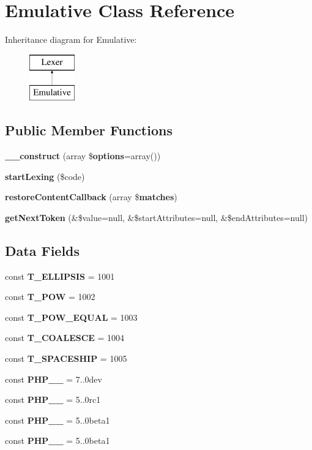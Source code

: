\section{Emulative Class Reference}
\label{class_php_parser_1_1_lexer_1_1_emulative}
Inheritance diagram for Emulative\+:\begin{figure}[H]
\begin{center}
\leavevmode
\includegraphics[height=2.000000cm]{class_php_parser_1_1_lexer_1_1_emulative}
\end{center}
\end{figure}
\subsection*{Public Member Functions}
\begin{DoxyCompactItemize}
\item 
{\bf \+\_\+\+\_\+construct} (array \${\bf options}=array())
\item 
{\bf start\+Lexing} (\$code)
\item 
{\bf restore\+Content\+Callback} (array \${\bf matches})
\item 
{\bf get\+Next\+Token} (\&\$value=null, \&\$start\+Attributes=null, \&\$end\+Attributes=null)
\end{DoxyCompactItemize}
\subsection*{Data Fields}
\begin{DoxyCompactItemize}
\item 
const {\bf T\+\_\+\+E\+L\+L\+I\+P\+S\+I\+S} = 1001
\item 
const {\bf T\+\_\+\+P\+O\+W} = 1002
\item 
const {\bf T\+\_\+\+P\+O\+W\+\_\+\+E\+Q\+U\+A\+L} = 1003
\item 
const {\bf T\+\_\+\+C\+O\+A\+L\+E\+S\+C\+E} = 1004
\item 
const {\bf T\+\_\+\+S\+P\+A\+C\+E\+S\+H\+I\+P} = 1005
\item 
const {\bf P\+H\+P\+\_\+\_} = \textquotesingle{}7..\+0dev\textquotesingle{}
\item 
const {\bf P\+H\+P\+\_\+\_} = \textquotesingle{}5..\+0rc1\textquotesingle{}
\item 
const {\bf P\+H\+P\+\_\+\_} = \textquotesingle{}5..\+0beta1\textquotesingle{}
\item 
const {\bf P\+H\+P\+\_\+\_} = \textquotesingle{}5..\+0beta1\textquotesingle{}
\end{DoxyCompactItemize}
